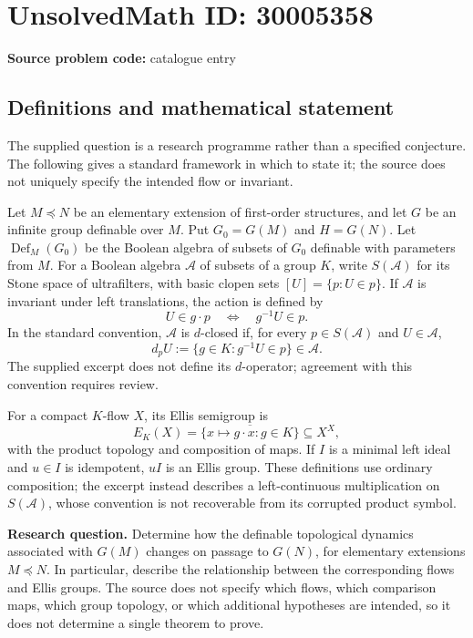 \documentclass[11pt]{article}
\begin{document}
\section*{UnsolvedMath ID: 30005358}
\textbf{Source problem code:} catalogue entry
\subsection{Definitions and mathematical statement}
The supplied question is a research programme rather than a specified conjecture. The following gives a standard framework in which to state it; the source does not uniquely specify the intended flow or invariant.

Let \(M\preccurlyeq N\) be an elementary extension of first-order structures, and let \(G\) be an infinite group definable over \(M\). Put \(G_0=G(M)\) and \(H=G(N)\). Let \(\operatorname{Def}_M(G_0)\) be the Boolean algebra of subsets of \(G_0\) definable with parameters from \(M\). For a Boolean algebra \(\mathcal A\) of subsets of a group \(K\), write \(S(\mathcal A)\) for its Stone space of ultrafilters, with basic clopen sets \([U]=\{p:U\in p\}\). If \(\mathcal A\) is invariant under left translations, the action is defined by
\[
 U\in g\cdot p\quad\Longleftrightarrow\quad g^{-1}U\in p.
\]
In the standard convention, \(\mathcal A\) is \(d\)-closed if, for every \(p\in S(\mathcal A)\) and \(U\in\mathcal A\),
\[
 d_pU:=\{g\in K:g^{-1}U\in p\}\in\mathcal A.
\]
The supplied excerpt does not define its \(d\)-operator; agreement with this convention requires review.

For a compact \(K\)-flow \(X\), its Ellis semigroup is
\[
 E_K(X)=\overline{\{x\mapsto g\cdot x:g\in K\}}\subseteq X^X,
\]
with the product topology and composition of maps. If \(I\) is a minimal left ideal and \(u\in I\) is idempotent, \(uI\) is an Ellis group. These definitions use ordinary composition; the excerpt instead describes a left-continuous multiplication on \(S(\mathcal A)\), whose convention is not recoverable from its corrupted product symbol.

\textbf{Research question.} Determine how the definable topological dynamics associated with \(G(M)\) changes on passage to \(G(N)\), for elementary extensions \(M\preccurlyeq N\). In particular, describe the relationship between the corresponding flows and Ellis groups. The source does not specify which flows, which comparison maps, which group topology, or which additional hypotheses are intended, so it does not determine a single theorem to prove.
\end{document}
